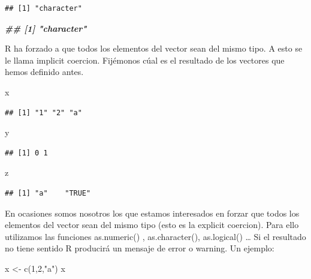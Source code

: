 \documentclass[
]{book}
\newenvironment{Shaded}{\begin{snugshade}}{\end{snugshade}}
\newcommand{\DecValTok}[1]{\textcolor[rgb]{0.00,0.00,0.81}{#1}}
\newcommand{\DocumentationTok}[1]{\textcolor[rgb]{0.56,0.35,0.01}{\textbf{\textit{#1}}}}
\newcommand{\FunctionTok}[1]{\textcolor[rgb]{0.00,0.00,0.00}{#1}}
\newcommand{\NormalTok}[1]{#1}
\newcommand{\OtherTok}[1]{\textcolor[rgb]{0.56,0.35,0.01}{#1}}
\newcommand{\StringTok}[1]{\textcolor[rgb]{0.31,0.60,0.02}{#1}}
\begin{document}
\begin{verbatim}
## [1] "character"
\end{verbatim}

\begin{Shaded}
\begin{Highlighting}[]
\DocumentationTok{\#\# [1] "character"}
\end{Highlighting}
\end{Shaded}

R ha forzado a que todos los elementos del vector sean del mismo tipo. A esto se le llama implicit coercion. Fijémonos cúal es el resultado de los vectores que hemos definido antes.

\begin{Shaded}
\begin{Highlighting}[]
\NormalTok{x}
\end{Highlighting}
\end{Shaded}

\begin{verbatim}
## [1] "1" "2" "a"
\end{verbatim}

\begin{Shaded}
\begin{Highlighting}[]
\NormalTok{y}
\end{Highlighting}
\end{Shaded}

\begin{verbatim}
## [1] 0 1
\end{verbatim}

\begin{Shaded}
\begin{Highlighting}[]
\NormalTok{z}
\end{Highlighting}
\end{Shaded}

\begin{verbatim}
## [1] "a"    "TRUE"
\end{verbatim}

En ocasiones somos nosotros los que estamos interesados en forzar que todos los elementos del vector sean del mismo tipo (esto es la explicit coercion). Para ello utilizamos las funciones as.numeric() , as.character(), as.logical() \ldots{} Si el resultado no tiene sentido R producirá un mensaje de error o warning. Un ejemplo:

\begin{Shaded}
\begin{Highlighting}[]
\NormalTok{x }\OtherTok{\textless{}{-}} \FunctionTok{c}\NormalTok{(}\DecValTok{1}\NormalTok{,}\DecValTok{2}\NormalTok{,}\StringTok{"a"}\NormalTok{)}
\NormalTok{x}
\end{Highlighting}
\end{Shaded}
\end{document}
